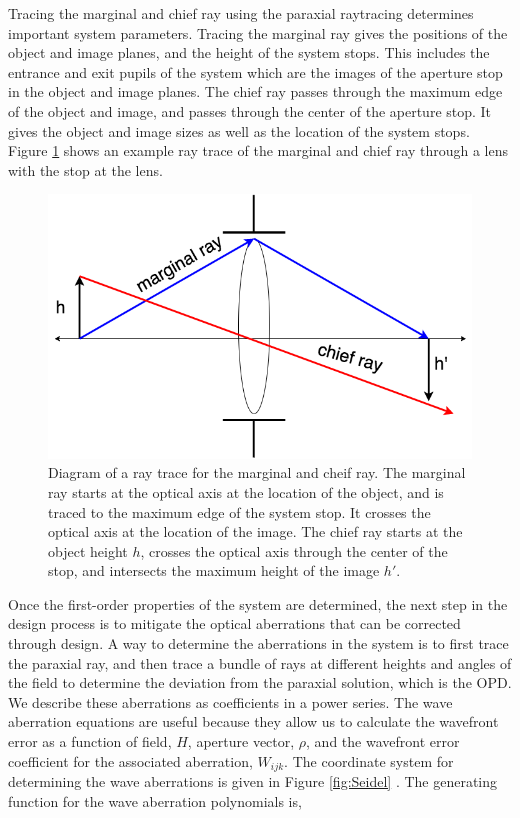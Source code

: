 Tracing the marginal and chief ray using the paraxial raytracing determines important system parameters. Tracing the marginal ray gives the positions of the object and image planes, and the height of the system stops. This includes the entrance and exit pupils of the system which are the images of the aperture stop in the object and image planes. The chief ray passes through the maximum edge of the object and image, and passes through the center of the aperture stop. It gives the object and image sizes as well as the location of the system stops. Figure \ref{fig:chiefray} shows an example ray trace of the marginal and chief ray through a lens with the stop at the lens. 


\begin{figure}
    \centering
    \includegraphics[width=.6\textwidth]{Chapter Materials/Chapter Three Materials/chiefandmarginal.png}
    \caption{Diagram of a ray trace for the marginal and cheif ray. The marginal ray starts at the optical axis at the location of the object, and is traced to the maximum edge of the system stop. It crosses the optical axis at the location of the image. The chief ray starts at the object height $h$, crosses the optical axis through the center of the stop, and intersects the maximum height of the image $h'$. }
    \label{fig:chiefray}
\end{figure}



Once the first-order properties of the system are determined, the next step in the design process is to mitigate the optical aberrations that can be corrected through design. A way to determine the aberrations in the system is to first trace the paraxial ray, and then trace a bundle of rays at different heights and angles of the field to determine the deviation from the paraxial solution, which is the OPD. We describe these aberrations as coefficients in a power series. The wave aberration equations are useful because they allow us to calculate the wavefront error as a function of field, $H$, aperture vector, $\rho$, and the wavefront error coefficient for the associated aberration, $W_{ijk}$. The coordinate system for determining the wave aberrations is given in Figure \ref{fig:Seidel} \citep{Liang503}. The generating function for the wave aberration polynomials is,


